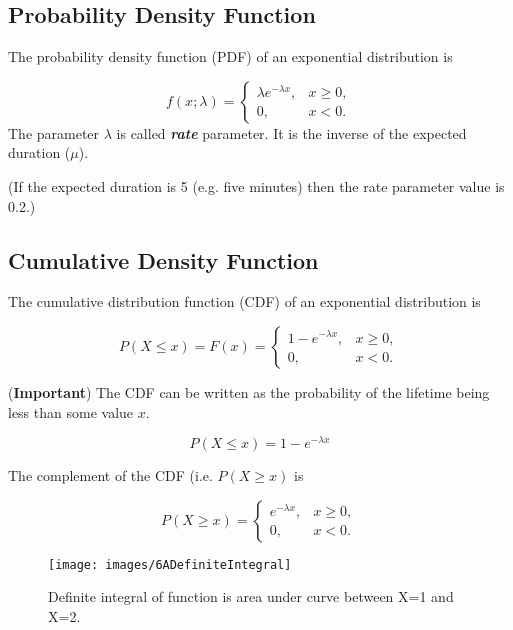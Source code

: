 \documentclass[a4paper,12pt]{article}
\begin{document}
\subsection*{Probability Density Function}

\noindent The probability density function (PDF) of an exponential distribution is

\[
f(x;\lambda) = \begin{cases}
\lambda e^{-\lambda x}, & x \ge 0, \\
0, & x < 0.
\end{cases}\]
\noindent The parameter $\lambda$  is called \textbf{\emph{rate}} parameter. It is the inverse of the expected duration ($\mu$).\\ \bigskip

\noindent (If the expected duration is 5 (e.g. five minutes) then the rate parameter value is 0.2.)




\subsection*{Cumulative Density Function}
\noindent The cumulative distribution function (CDF) of an exponential distribution is

\[
P(X \leq x) = F(x) = \begin{cases}
1-e^{-\lambda x}, & x \ge 0, \\
0, & x < 0.
\end{cases}\]

\noindent (\textbf{Important}) The CDF can be written as the probability of the lifetime being less than some value $x$.

\[ P(X \leq x) = 1-e^{-\lambda x} \]



\noindent The complement of the CDF (i.e. $P(X \geq x)$ is

\[
P(X \geq x) = \begin{cases}
e^{-\lambda x}, & x \ge 0, \\
0, & x < 0.
\end{cases}\]












\begin{figure}[h!]
\centering
\texttt{[image: images/6ADefiniteIntegral]}
\caption{Definite integral of function is area under curve between X=1 and X=2.}
\label{fig:6adefiniteintegral}
\end{figure}
\end{document}
